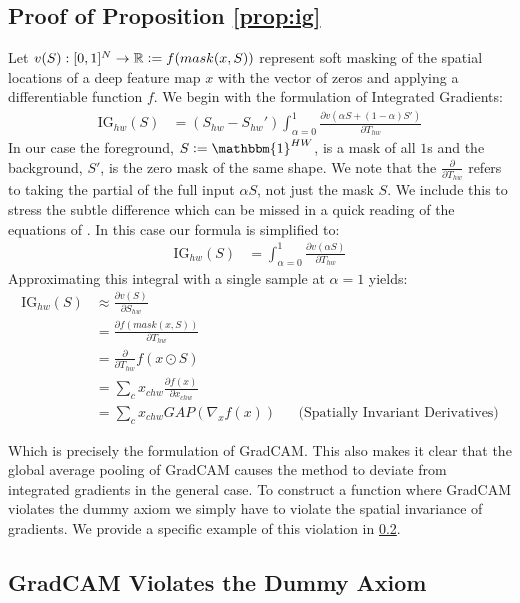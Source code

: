 \documentclass{article} %
\newcommand{\defeq}{\vcentcolon=}
\begin{document}
\subsection{Proof of Proposition \ref{prop:ig}}
\label{sec:proof-prop-ig}
 Let $v(S): [0,1]^N \to \mathbb{R} \defeq f(mask(x, S))$ represent soft masking of the spatial locations of a deep feature map $x$ with the vector of zeros and applying a differentiable function $f$. We begin with the formulation of Integrated Gradients:
 \begin{align*}
     \text{IG}_{hw}(S) &= (S_{hw} - S_{hw}') \int_{\alpha=0}^1 \frac{\partial v(\alpha S + (1-\alpha)S')}{\partial T_{hw}}
 \end{align*}
 In our case the foreground, $S \defeq \mathbbm{1}^{HW}$, is a mask of all $1$s and the background, $S'$, is the zero mask of the same shape. We note that the $\frac{\partial}{\partial T_{hw}}$ refers to taking the partial of the full input $\alpha S$, not just the mask $S$. We include this to stress the subtle difference which can be missed in a quick reading of the equations of \cite{integrated-gradients}. In this case our formula is simplified to:
  \begin{align*}
     \text{IG}_{hw}(S) &= \int_{\alpha=0}^1 \frac{\partial v(\alpha S)}{\partial T_{hw}}
 \end{align*}
 Approximating this integral with a single sample at $\alpha=1$ yields:
   \begin{align*}
     \text{IG}_{hw}(S) &\approx \frac{\partial v(S)}{\partial S_{hw}} \\
     &= \frac{\partial f(mask(x,S))}{\partial T_{hw}} \\
     &= \frac{\partial}{\partial T_{hw}} f(x \odot S) \\
     &= \sum_c x_{chw} \frac{\partial f(x)}{\partial{x_{chw}}} \\
     &= \sum_c x_{chw} GAP(\nabla_x f(x)) && \text{(Spatially Invariant Derivatives)} 
 \end{align*}
 
 Which is precisely the formulation of GradCAM. This also makes it clear that the global average pooling of GradCAM causes the method to deviate from integrated gradients in the general case. To construct a function where GradCAM violates the dummy axiom we simply have to violate the spatial invariance of gradients. We provide a specific example of this violation in \ref{sec:dummy-violation}.


\subsection{GradCAM Violates the Dummy Axiom}
\label{sec:dummy-violation}
\end{document}
